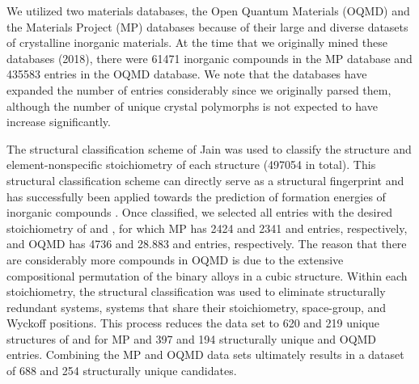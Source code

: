 %
We utilized two materials databases, the Open Quantum Materials (OQMD) and the Materials Project (MP) databases because of their large and diverse datasets of crystalline inorganic materials.
%
At the time that we originally mined these databases (2018), there were \num{61471} inorganic compounds in the MP database and \num{435583} entries in the OQMD database.
%
We note that the databases have expanded the number of entries considerably since we originally parsed them,
although the number of unique crystal polymorphs is not expected to have increase significantly.


%
%
The structural classification scheme of Jain  was used to classify the structure and element-nonspecific stoichiometry of each structure (\num{497054} in total).
%
This structural classification scheme can directly serve as a structural fingerprint and has successfully been applied towards the prediction of formation energies of inorganic compounds \cite{Jain2018}.
%
%
Once classified, we selected all entries with the desired stoichiometry of \ABtwo and \ABthree,
for which MP has \num{2424} and \num{2341} \ABtwo and \ABthree entries, respectively,
and OQMD has \num{4736} and \num{28,883} \ABtwo and \ABthree entries, respectively.
%
The reason that there are considerably more \ABthree compounds in OQMD is due to the extensive compositional permutation of the binary alloys in a cubic \ABthree structure.
%
%
Within each stoichiometry, the structural classification was used to eliminate structurally redundant systems,
 systems that share their stoichiometry, space-group, and Wyckoff positions.
%
This process reduces the data set to \num{620} and \num{219} unique structures of \ABtwo and \ABthree for MP and \num{397} and \num{194} structurally unique \ABtwo and \ABthree OQMD entries.
%
Combining the MP and OQMD data sets ultimately results in a dataset of \num{688} \ABtwo and \num{254} \ABthree structurally unique candidates.


